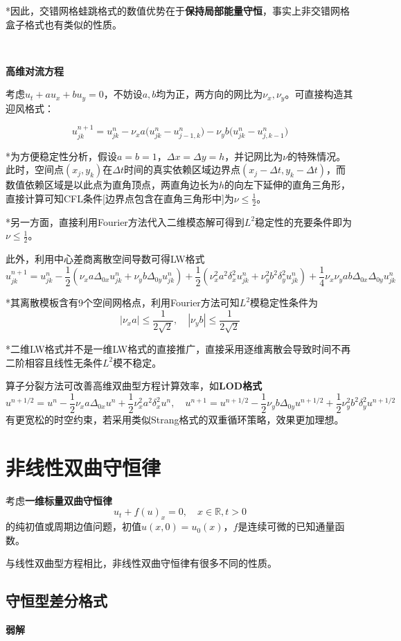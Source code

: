 \documentclass[a4paper,UTF8,fontset=windows]{ctexart}
\begin{document}
*因此，交错网格蛙跳格式的数值优势在于\textbf{保持局部能量守恒}，事实上非交错网格盒子格式也有类似的性质。

\

\textbf{高维对流方程}

考虑$u_t+au_x+bu_y=0$，不妨设$a,b$均为正，两方向的网比为$\nu_x,\nu_y$。可直接构造其迎风格式：

$$u_{jk}^{n+1}=u_{jk}^n-\nu_xa\big(u_{jk}^n-u_{j-1,k}^n\big)-\nu_yb\big(u_{jk}^n-u_{j,k-1}^n\big)$$

*为方便稳定性分析，假设$a=b=1$，$\Delta x=\Delta y=h$，并记网比为$\nu$的特殊情况。此时，空间点$(x_j,y_k)$在$\Delta t$时间的真实依赖区域边界点$(x_j-\Delta t,y_k-\Delta t)$，而数值依赖区域是以此点为直角顶点，两直角边长为$h$的向左下延伸的直角三角形，直接计算可知CFL条件[边界点包含在直角三角形中]为$\nu\le\frac{1}{2}$。

*另一方面，直接利用Fourier方法代入二维模态解可得到$L^2$稳定性的充要条件即为$\nu\le\frac{1}{2}$。

此外，利用中心差商离散空间导数可得LW格式
$$u_{jk}^{n+1}=u_{jk}^n-\frac{1}{2}(\nu_xa\Delta_{0x}u_{jk}^n+\nu_yb\Delta_{0y}u_{jk}^n)+\frac{1}{2}(\nu_x^2a^2\delta_x^2u_{jk}^n+\nu_y^2b^2\delta_y^2u_{jk}^n)+\frac{1}{4}\nu_x\nu_yab\Delta_{0x}\Delta_{0y}u_{jk}^n$$

*其离散模板含有9个空间网格点，利用Fourier方法可知$L^2$模稳定性条件为
$$|\nu_xa|\le\frac{1}{2\sqrt2},\quad|\nu_yb|\le\frac{1}{2\sqrt2}$$

*二维LW格式并不是一维LW格式的直接推广，直接采用逐维离散会导致时间不再二阶相容且线性无条件$L^2$模不稳定。

算子分裂方法可改善高维双曲型方程计算效率，如\textbf{LOD格式}
$$u^{n+1/2}=u^n-\frac{1}{2}\nu_xa\Delta_{0x}u^n+\frac{1}{2}\nu_x^2a^2\delta_x^2u^n,\quad u^{n+1}=u^{n+1/2}-\frac{1}{2}\nu_yb\Delta_{0y}u^{n+1/2}+\frac{1}{2}\nu_y^2b^2\delta_y^2u^{n+1/2}$$
有更宽松的时空约束，若采用类似Strang格式的双重循环策略，效果更加理想。

\section{非线性双曲守恒律}
考虑\textbf{一维标量双曲守恒律}
$$u_t+f(u)_x=0,\quad x\in\mathbb{R},t>0$$
的纯初值或周期边值问题，初值$u(x,0)=u_0(x)$，$f$是连续可微的已知通量函数。

与线性双曲型方程相比，非线性双曲守恒律有很多不同的性质。

\subsection{守恒型差分格式}
\textbf{弱解}
\end{document}
